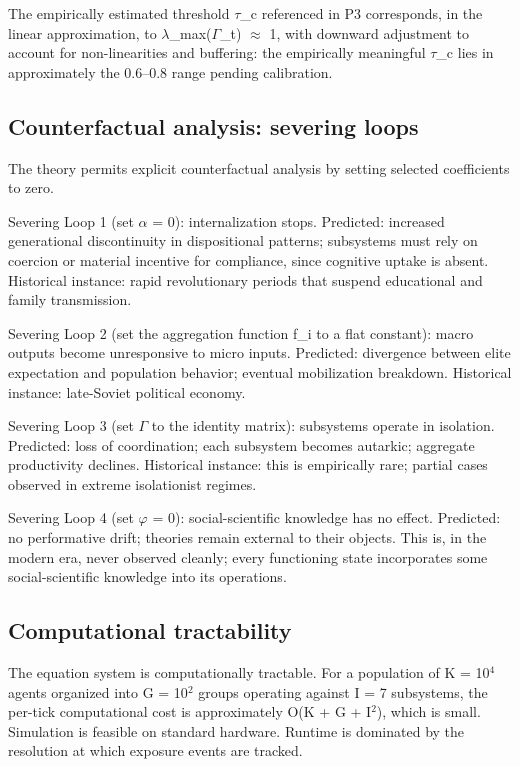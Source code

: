 \documentclass[12pt,a4paper]{article}
\begin{document}
The empirically estimated threshold $\tau$_c referenced in P3 corresponds, in the linear approximation, to $\lambda$_max($\Gamma$_t) $\approx$ 1, with downward adjustment to account for non-linearities and buffering: the empirically meaningful $\tau$_c lies in approximately the 0.6--0.8 range pending calibration.

\subsection{Counterfactual analysis: severing loops}

The theory permits explicit counterfactual analysis by setting selected coefficients to zero.


Severing Loop 1 (set $\alpha$ = 0): internalization stops. Predicted: increased generational discontinuity in dispositional patterns; subsystems must rely on coercion or material incentive for compliance, since cognitive uptake is absent. Historical instance: rapid revolutionary periods that suspend educational and family transmission.

Severing Loop 2 (set the aggregation function f_i to a flat constant): macro outputs become unresponsive to micro inputs. Predicted: divergence between elite expectation and population behavior; eventual mobilization breakdown. Historical instance: late-Soviet political economy.

Severing Loop 3 (set $\Gamma$ to the identity matrix): subsystems operate in isolation. Predicted: loss of coordination; each subsystem becomes autarkic; aggregate productivity declines. Historical instance: this is empirically rare; partial cases observed in extreme isolationist regimes.

Severing Loop 4 (set $\varphi$ = 0): social-scientific knowledge has no effect. Predicted: no performative drift; theories remain external to their objects. This is, in the modern era, never observed cleanly; every functioning state incorporates some social-scientific knowledge into its operations.

\subsection{Computational tractability}

The equation system is computationally tractable. For a population of K = 10$^4$ agents organized into G = 10$^2$ groups operating against I = 7 subsystems, the per-tick computational cost is approximately O(K + G + I$^2$), which is small. Simulation is feasible on standard hardware. Runtime is dominated by the resolution at which exposure events are tracked.
\end{document}
